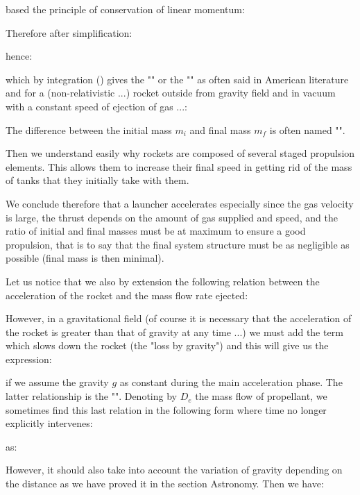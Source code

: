 	based the principle of conservation of linear momentum:
	
	Therefore after simplification:
	
	hence:
	
	which by integration () gives the "" or the "" as often said in American literature and for a (non-relativistic ...) rocket outside from gravity field and in vacuum with a constant speed  of ejection of gas ...:
	
	The difference between the initial mass $m_i$ and final mass $m_f$ is often named "".
	
	Then we understand easily why rockets are composed of several staged propulsion elements. This allows them to increase their final speed in getting rid of the mass of tanks that they initially take with them.

	We conclude therefore that a launcher accelerates especially since the gas velocity is large, the thrust depends on the amount of gas supplied and speed, and the ratio of initial and final masses must be at maximum to ensure a good propulsion, that is to say that the final system structure must be as negligible as possible (final mass is then minimal).
	
	Let us notice that we also by extension the following relation between the acceleration of the rocket and the mass flow rate ejected:
	
	However, in a gravitational field (of course it is necessary that the acceleration of the rocket is greater than that of gravity at any time ...) we must add the term which slows down the rocket (the "loss by gravity") and this will give us the expression:
	
	if we assume the gravity $g$ as constant during the main acceleration phase. The latter relationship is the "". Denoting by $D_e$ the mass flow of propellant, we sometimes find this last relation in the following form where time no longer explicitly intervenes:
	
	as:
	
	However, it should also take into account the variation of gravity depending on the distance as we have proved it in the section Astronomy. Then we have:
	
